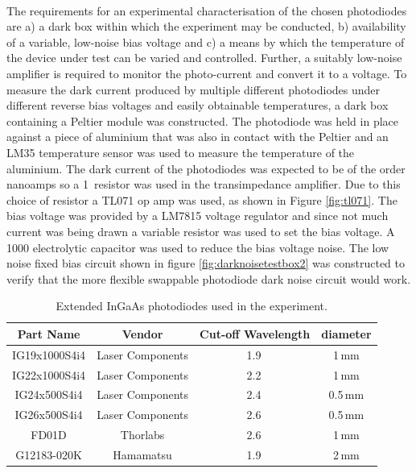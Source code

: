 \paragraph{}
The requirements for an experimental characterisation of the chosen photodiodes are a) a dark box within which the experiment may be conducted, b) availability of a variable, low-noise bias voltage and c) a means by which the temperature of the device under test can be varied and controlled. Further, a suitably low-noise amplifier is required to monitor the photo-current and convert it to a voltage. To measure the dark current produced by multiple different photodiodes under different reverse bias voltages and easily obtainable temperatures, a dark box containing a Peltier module was constructed. The photodiode was held in place against a piece of aluminium that was also in contact with the Peltier and an LM35 temperature sensor was used to measure the temperature of the aluminium. The dark current of the photodiodes was expected to be of the order nanoamps so a 1\,\SIunits{\mega\ohm} resistor was used in the transimpedance amplifier. Due to this choice of resistor a TL071 op amp was used, as shown in Figure \ref{fig:tl071}. The bias voltage was provided by a LM7815 voltage regulator and since not much current was being drawn a variable resistor was used to set the bias voltage. A 1000 electrolytic capacitor was used to reduce the bias voltage noise. The low noise fixed bias circuit shown in figure \ref{fig:darknoisetestbox2} was constructed to verify that the more flexible swappable photodiode dark noise circuit would work.
\begin{table}
	\centering
	\begin{tabular}{| c | c | c | c |}
		\hline
		Part Name & Vendor & Cut-off Wavelength & diameter  \\ \hline
		IG19x1000S4i4 & Laser Components & 1.9\,\SIunits{\micro\metre} & 1\,mm \\ 
		IG22x1000S4i4 & Laser Components & 2.2\,\SIunits{\micro\metre} & 1\,mm \\ 
		IG24x500S4i4 & Laser Components & 2.4\,\SIunits{\micro\metre} & 0.5\,mm \\ 
		IG26x500S4i4 & Laser Components & 2.6\,\SIunits{\micro\metre} & 0.5\,mm \\ 
		FD01D & Thorlabs & 2.6\,\SIunits{\micro\metre} & 1\,mm \\ 
		G12183-020K & Hamamatsu & 1.9\,\SIunits{\micro\metre} & 2\,mm \\ \hline
	\end{tabular}
\caption{Extended InGaAs photodiodes used in the experiment.}
\label{tab:photodoides}
\end{table}
